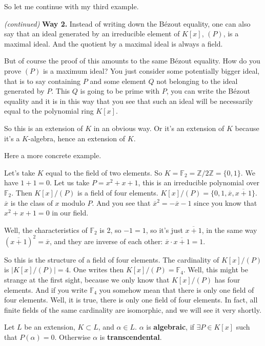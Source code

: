 So let me continue with my third example. 
\begin{example} \textit{(continued)}
\textbf{Way 2.} Instead of writing down the Bézout equality, one can also say that an ideal generated by an irreducible element of $K[x]$, $(P)$, is a maximal ideal. And the quotient by a maximal ideal is always a field.

But of course the proof of this amounts to the same Bézout equality. How do you prove $(P)$ is a maximum ideal? You just consider some potentially bigger ideal, that is to say containing $P$ and some element $Q$ not belonging to the ideal generated by $P$. This $Q$ is going to be prime with $P$, you can write the Bézout equality and it is in this way that you see that such an ideal will be necessarily equal to the polynomial ring $K[x]$. 

So this is an extension of $K$ in an obvious way. Or it's an extension of $K$ because it's a $K$-algebra, hence an extension of $K$.
\end{example}

Here a more concrete example. 
\begin{example}
Let's take $K$ equal to the field of two elements. So $K=\mathbb{F}_2=\mathbb{Z}/2\mathbb{Z}=\{0,1\}$. We have $1 + 1=0$. Let us take $P = x^2 + x + 1$, this is an irreducible polynomial over $\mathbb{F}_2$. Then $K[x]/(P)$ is a field of four elements. $K[x]/(P) = \{0,1,\overbar{x},\overbar{x+1}\}$. $\overbar{x}$ is the class of $x$ modulo $P$. And you see that $\overbar{x} ^2 = -\overbar{x}-1$ since you know that $x^2+x+1 = 0$ in our field. 

Well, the characteristics of $\mathbb{F}_2$ is 2, so $-1 = 1$, so it's just $\overbar{x+1}$, in the same way $(\overbar{x+1})^2 = \overbar{x}$, and they are inverse of each other: $\overbar{x}\cdot \overbar{x+1} = 1$. 

So this is the structure of a field of four elements. The cardinality of $K[x]/(P)$ is $|K[x]/(P)|=4$. One writes then $K[x]/(P)=\mathbb{F}_4$. Well, this might be strange at the first sight, because we only know that $K[x]/(P)$ has four elements. And if you write $\mathbb{F}_4$ you somehow mean that there is only one field of four elements. Well, it is true, there is only one field of four elements. In fact, all finite fields of the same cardinality are isomorphic, and we will see it very shortly. 
\end{example}

\begin{definition}
Let $L$ be an extension, $K \subset L$, and $\alpha \in L$. $\alpha$ is \textbf{algebraic}, if $\exists P \in K[x]$ such that $P(\alpha)=0$. Otherwise $\alpha$ is \textbf{transcendental}.
\end{definition}

